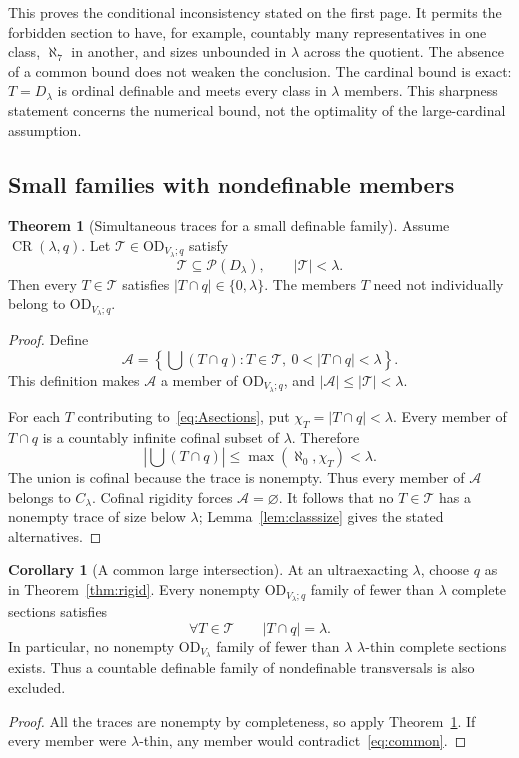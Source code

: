 \documentclass[11pt,letterpaper]{article}
\theoremstyle{definition}
\newtheorem{theorem}[definition]{Theorem}
\newtheorem{corollary}[definition]{Corollary}
\numberwithin{equation}{section}
\newcommand{\OD}{\mathrm{OD}}
\newcommand{\Pow}{\mathcal P}
\newcommand{\D}{D_\lambda}
\newcommand{\C}{C_\lambda}
\newcommand{\ODlow}{\OD_{V_\lambda}}
\newcommand{\ODq}{\OD_{V_\lambda;q}}
\newcommand{\Rig}{\operatorname{CR}}
\begin{document}
This proves the conditional inconsistency stated on the first page. It permits the forbidden section to have, for example, countably many representatives in one class, $\aleph_7$ in another, and sizes unbounded in $\lambda$ across the quotient. The absence of a common bound does not weaken the conclusion. The cardinal bound is exact: $T=\D$ is ordinal definable and meets every class in $\lambda$ members. This sharpness statement concerns the numerical bound, not the optimality of the large-cardinal assumption.

\subsection{Small families with nondefinable members}

\begin{theorem}[Simultaneous traces for a small definable family]\label{thm:smallfam}
Assume $\Rig(\lambda,q)$. Let $\mathcal T\in\ODq$ satisfy
\[
\mathcal T\subseteq\Pow(\D),\qquad |\mathcal T|<\lambda.
\]
Then every $T\in\mathcal T$ satisfies $|T\cap q|\in\{0,\lambda\}$. The members $T$ need not individually belong to $\ODq$.
\end{theorem}
\begin{proof}
Define
\begin{equation}
\mathcal A=
\left\{\bigcup(T\cap q):
T\in\mathcal T,\ 0<|T\cap q|<\lambda\right\}.
\label{eq:Asections}
\end{equation}
This definition makes $\mathcal A$ a member of $\ODq$, and $|\mathcal A|\le|\mathcal T|<\lambda$.

For each $T$ contributing to~\eqref{eq:Asections}, put $\chi_T=|T\cap q|<\lambda$. Every member of $T\cap q$ is a countably infinite cofinal subset of $\lambda$. Therefore
\[
\left|\bigcup(T\cap q)\right|
\le \max(\aleph_0,\chi_T)<\lambda.
\]
The union is cofinal because the trace is nonempty. Thus every member of $\mathcal A$ belongs to $\C$. Cofinal rigidity forces $\mathcal A=\varnothing$. It follows that no $T\in\mathcal T$ has a nonempty trace of size below $\lambda$; Lemma~\ref{lem:classsize} gives the stated alternatives.
\end{proof}

\begin{corollary}[A common large intersection]\label{cor:common}
At an ultraexacting $\lambda$, choose $q$ as in Theorem~\ref{thm:rigid}. Every nonempty $\ODq$ family of fewer than $\lambda$ complete sections satisfies
\begin{equation}
\forall T\in\mathcal T\qquad |T\cap q|=\lambda.
\label{eq:common}
\end{equation}
In particular, no nonempty $\ODlow$ family of fewer than $\lambda$ $\lambda$-thin complete sections exists. Thus a countable definable family of nondefinable transversals is also excluded.
\end{corollary}
\begin{proof}
All the traces are nonempty by completeness, so apply Theorem~\ref{thm:smallfam}. If every member were $\lambda$-thin, any member would contradict~\eqref{eq:common}.
\end{proof}
\end{document}
